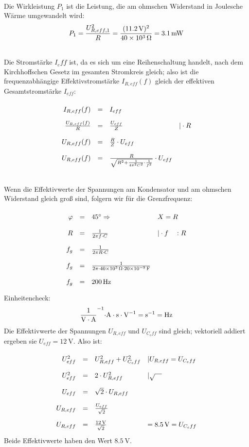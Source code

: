 \documentclass[a4paper]{article}
\begin{document}
\\
Die Wirkleistung $P_1$ ist die Leistung, die am ohmschen Widerstand in Joulesche Wärme umgewandelt wird:
$$P_1 = {U_{R,eff,1}^2 \over R} = {(\SI{11,2}{\volt})^2 \over \SI{40e3}{\ohm}} = \SI{3,1}{\milli\watt}$$
\vspace{0.5 cm}

\\
Die Stromstärke $I_eff$ ist, da es sich um eine Reihenschaltung handelt, nach dem Kirchhoffschen Gesetz im gesamten Stromkreis gleich; also ist die frequenzabhängige Effektivstromstärke $I_{R,eff}(f)$ gleich der effektiven Gesamtstromstärke  $I_{eff}$: 
$$
\renewcommand{\arraystretch}{2}
\begin{array}{rcll}
 I_{R,eff}(f) & = & I_{eff}  \\
 {U_{R,eff}(f) \over R} & = & {U_{eff}\over Z} &|\cdot R\\
 U_{R,eff}(f) & = & {R \over Z} \cdot U_{eff} \\
 U_{R,eff}(f) & = & {R \over \sqrt{R^2 + {1 \over 4 \pi^2 C^2} \cdot {1 \over f^2}}} \cdot U_{eff}
\end{array}
$$ 
\vspace{0.5 cm}

\\
Wenn die Effektivwerte der Spannungen am Kondensator und am ohmschen Widerstand gleich groß sind, folgern wir für die Grenzfrequenz:
$$ 
\renewcommand{\arraystretch}{2}
\begin{array}{rcll}
\varphi & = & 45^\circ \Rightarrow & X = R \\
     R  & = & {1 \over 2 \pi f \cdot C}  & | \cdot f \quad :R\\
     f_g  & = & {1 \over 2 \pi R \cdot C}\\
     f_g  & = & {1 \over 2 \pi \cdot \SI{40e3}{\ohm} \cdot \SI{20e-9}{\farad}}\\
     f_g  & = & \SI{200}{\hertz} 
\end{array}
$$ 
Einheitencheck:
$$\SI{}{1 \over \volt\cdot \ampere^{-1}\cdot \ampere\cdot \second \cdot \volt^{-1}}= \SI{}{\second^{-1}}=\SI{}{\hertz}$$
Die Effektivwerte der Spannungen $U_{R,eff}$ und $U_{C_eff}$ sind gleich; vektoriell addiert ergeben sie $U_{eff}=\SI{12}{\volt}$. Also ist:
$$
\renewcommand{\arraystretch}{2}
\begin{array}{rcll}
U_{eff}^2 & = & U_{R,eff}^2+ U_{C_eff}^2 & | U_{R,eff} = U_{C_eff}\\
U_{eff}^2 & = & 2\cdot U_{R,eff}^2 &| \sqrt{\quad} \\
U_{eff}   & = & \sqrt{2} \cdot U_{R,eff} \\
U_{R,eff} & = & {U_{eff} \over \sqrt{2}} \\
U_{R,eff} & = & {\SI{12}{\volt} \over \sqrt{2}} & = \SI{8,5}{\volt} = U_{C_eff}
\end{array}
$$ 
Beide Effektivwerte haben den Wert $\SI{8,5}{\volt}$.
\vspace{0.5 cm}
\end{document}
